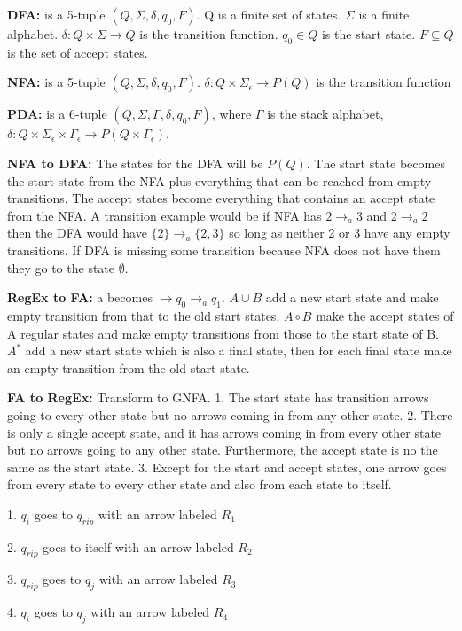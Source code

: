 \documentclass[12pt]{article}
\begin{document}
\textbf{DFA:} is a 5-tuple $(Q,\Sigma,\delta,q_0,F)$. Q is a finite set of states. $\Sigma$ is a finite alphabet. $\delta: Q \times \Sigma \rightarrow Q$ is the transition function. $q_0 \in Q$ is the start state. $F \subseteq Q$ is the set of accept states.

\textbf{NFA:} is a 5-tuple $(Q,\Sigma,\delta,q_0,F)$. $\delta: Q \times \Sigma_\epsilon \rightarrow P(Q)$ is the transition function

\textbf{PDA:} is a 6-tuple $(Q,\Sigma,\Gamma,\delta,q_0,F)$, where $\Gamma$ is the stack alphabet, $\delta: Q \times \Sigma_\epsilon \times \Gamma_\epsilon \rightarrow P(Q \times \Gamma_\epsilon)$.

\textbf{NFA to DFA:} The states for the DFA will be $P(Q)$. The start state becomes the start state from the NFA plus everything that can be reached from empty transitions. The accept states become everything that contains an accept state from the NFA. A transition example would be if NFA has $2 \rightarrow_a 3$ and $2 \rightarrow_a 2$ then the DFA would have $\{2\} \rightarrow_a \{2,3\}$ so long as neither 2 or 3 have any empty transitions. If DFA is missing some transition because NFA does not have them they go to the state $\emptyset$.

\textbf{RegEx to FA:} a becomes $\rightarrow q_0 \rightarrow_a q_1$. $A \cup B$ add a new start state and make empty transition from that to the old start states. $A \circ B$ make the accept states of A regular states and make empty transitions from those to the start state of B. $A^*$ add a new start state which is also a final state, then for each final state make an empty transition from the old start state.

\textbf{FA to RegEx:} Transform to GNFA. 1. The start state has transition arrows going to every other state but no arrows coming in from any other state. 2. There is only a single accept state, and it has arrows coming in from every other state but no arrows going to any other state. Furthermore, the accept state is no the same as the start state. 3. Except for the start and accept states, one arrow goes from every state to every other state and also from each state to itself.

1. $q_i$ goes to $q_{rip}$ with an arrow labeled $R_1$

2. $q_{rip}$ goes to itself with an arrow labeled $R_2$

3. $q_{rip}$ goes to $q_j$ with an arrow labeled $R_3$

4. $q_i$ goes to $q_j$ with an arrow labeled $R_4$
\end{document}
